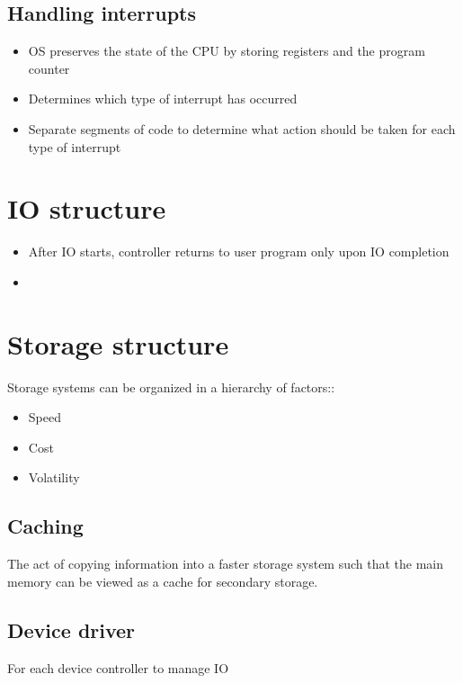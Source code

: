 \documentclass[12pt]{book}
\begin{document}
\subsection*{Handling interrupts}

\begin{itemize}
    \item OS preserves the state of the CPU by storing registers and the program counter
    \item Determines which type of interrupt has occurred
    \item Separate segments of code to determine what action should be taken for each type of interrupt
\end{itemize}

\section*{IO structure}

\begin{itemize}
    \item After IO starts, controller returns to user program only upon IO completion
    \item 
\end{itemize}

\section*{Storage structure}

Storage systems can be organized in a hierarchy of factors::

\begin{itemize}
    \item Speed
    \item Cost
    \item Volatility
\end{itemize}

\subsection*{Caching}
The act of copying information into a faster storage system such that the main memory can be viewed as a cache for secondary storage.

\subsection*{Device driver}

For each device controller to manage IO
\end{document}
